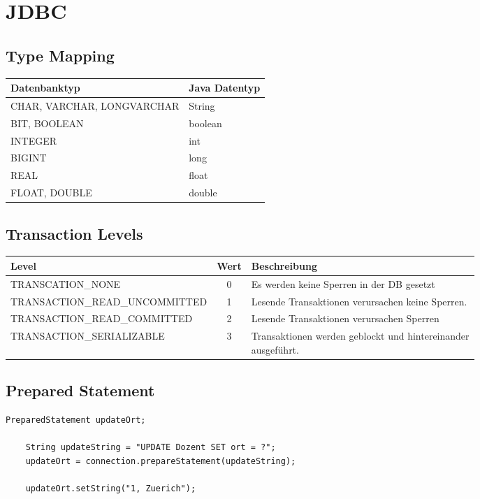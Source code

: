 \section{JDBC}

\subsection{Type Mapping}
\begin{tabular}{|l|l|}
    \hline
    \textbf{Datenbanktyp} & \textbf{Java Datentyp} \\
    \hline
    CHAR, VARCHAR, LONGVARCHAR & String \\
    \hline
    BIT, BOOLEAN &  boolean \\
    \hline
    INTEGER & int \\
    \hline
    BIGINT & long \\
    \hline
    REAL & float \\
    \hline
    FLOAT, DOUBLE & double \\
    \hline
\end{tabular}

\subsection{Transaction Levels}
\begin{tabular}{|l|c|l|}
    \hline
    \textbf{Level} & \textbf{Wert} & \textbf{Beschreibung} \\
    \hline
    TRANSCATION\_NONE & 0 & Es werden keine Sperren in der DB gesetzt \\
    \hline
    TRANSACTION\_READ\_UNCOMMITTED & 1 & Lesende Transaktionen verursachen keine Sperren. \\
    \hline
    TRANSACTION\_READ\_COMMITTED & 2 & Lesende Transaktionen verursachen Sperren \\
    \hline
    TRANSACTION\_SERIALIZABLE & 3 & \specialcell{Transaktionen werden geblockt und hintereinander\\ ausgeführt.} \\
    \hline
\end{tabular}

\subsection{Prepared Statement}

\begin{lstlisting}[style=customJava]
    PreparedStatement updateOrt;
    
    String updateString = "UPDATE Dozent SET ort = ?";
    updateOrt = connection.prepareStatement(updateString);
    
    updateOrt.setString("1, Zuerich");
\end{lstlisting}


